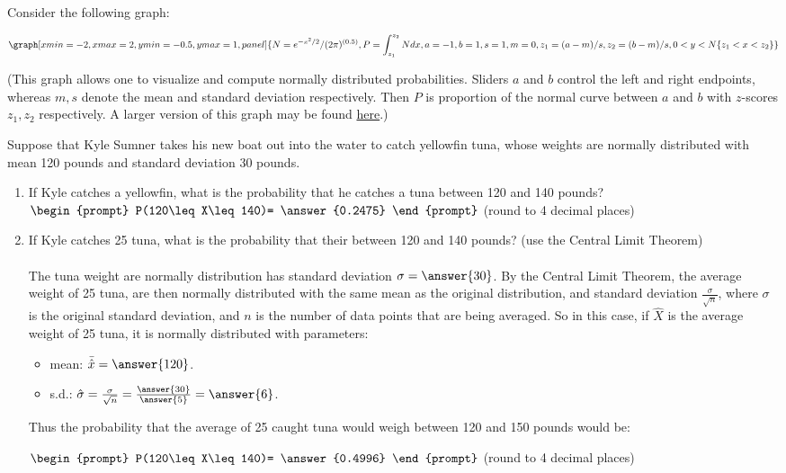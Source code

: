 \documentclass{ximera}
\begin{document}
\begin{question}

Consider the following graph:

\begin{onlineOnly}
$$\graph[xmin=-2,xmax=2,ymin=-0.5,ymax=1, panel]{N=e^{-x^2/2}/(2\pi)^{(0.5)}, P=\int_{z_1}^{z_2} N dx, a=-1, b=1, s=1, m=0, z_1=(a-m)/s, z_2=(b-m)/s, 0<y<N\{z_1<x<z_2\}}$$
\end{onlineOnly}
(This graph allows one to visualize and compute normally distributed probabilities.  Sliders $a$ and $b$ control the left and right endpoints, whereas $m, s$ denote the mean and standard deviation respectively.  Then $P$ is proportion of the normal curve between $a$ and $b$ with $z$-scores $z_1, z_2$ respectively.  A larger version of this graph may be found \href{https://www.desmos.com/calculator/y1pdds9uga}{here}.)


Suppose that Kyle Sumner takes his new boat out into the water to catch yellowfin tuna, whose weights are normally distributed with mean 120 pounds and standard deviation 30 pounds.  

\begin{enumerate}
\item If Kyle catches a yellowfin, what is the probability that he catches a tuna between 120 and 140 pounds? $\begin{prompt}
    P(120\leq X\leq 140)= \answer{0.2475}
  \end{prompt}$ (round to 4 decimal places)
  \item If Kyle catches 25 tuna,  what is the probability that their between 120 and 140 pounds? (use the Central Limit Theorem)\\ \\

The tuna weight are normally distribution has standard deviation $\sigma=\answer{30}$.  By the Central Limit Theorem, the average weight of 25 tuna, are then normally distributed with the same mean as the original distribution, and standard deviation $\frac{\sigma}{\sqrt{n}}$, where $\sigma$ is the original standard deviation, and $n$ is the number of data points that are being averaged.  So in this case, if $\hat{X}$ is the average weight of 25 tuna, it is normally distributed with parameters:

\begin{itemize}
\item mean: $\bar{\hat{x}}=\answer{120}$.
\item s.d.: $\hat{\sigma}=\frac{\sigma}{\sqrt{n}}=\frac{\answer{30}}{\answer{5}}=\answer{6}$.
\end{itemize}

Thus the probability that the average of 25 caught tuna would weigh between 120 and 150 pounds would be:

  $\begin{prompt}
    P(120\leq X\leq 140)= \answer{0.4996}
  \end{prompt}$ (round to 4 decimal places)
\end{enumerate}

\end{question}
\end{document}
